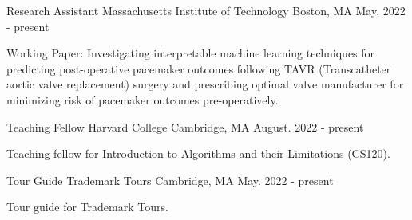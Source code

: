
\begin{cventries}

  \vspace{1mm}
  \cventry
    {Research Assistant} %
    {Massachusetts Institute of Technology} %
    {Boston, MA} %
    {May. 2022 - present} %
    {
      \begin{cvitems} %
        \item {Working Paper: Investigating interpretable machine learning techniques for 
        predicting post-operative pacemaker outcomes following TAVR
        (Transcatheter aortic valve replacement) surgery and prescribing optimal 
        valve manufacturer for minimizing risk of pacemaker outcomes pre-operatively.}
      \end{cvitems}
    }

\cventry
    {Teaching Fellow} %
    {Harvard College} %
    {Cambridge, MA} %
    {August. 2022 - present} %
    {
      \begin{cvitems} %
        \item {Teaching fellow for Introduction to Algorithms and their Limitations (CS120).}
      \end{cvitems}
    }
    
\cventry
    {Tour Guide}
    {Trademark Tours}
    {Cambridge, MA}
    {May. 2022 - present}
    {
      \begin{cvitems}
        \item{Tour guide for Trademark Tours.}
      \end{cvitems}
    }


\end{cventries}
